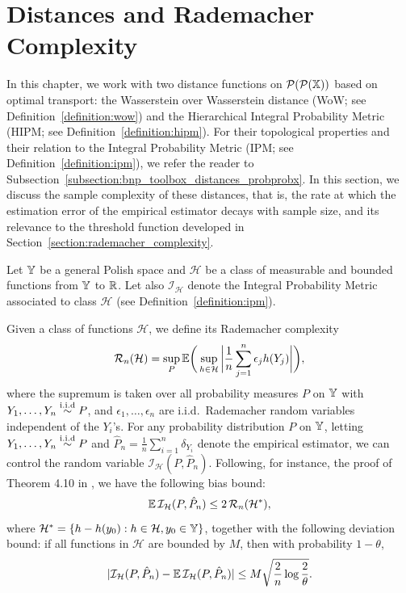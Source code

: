 \section{Distances and Rademacher Complexity}\label{section:two_sample_distances}

In this chapter, we work with two distance functions on $\mathcal{P}(\mathcal{P}(\mathbb{X}))$ based on optimal transport: the Wasserstein over Wasserstein distance (WoW; see Definition~\ref{definition:wow}) and the Hierarchical Integral Probability Metric (HIPM; see Definition~\ref{definition:hipm}). For their topological properties and their relation to the Integral Probability Metric (IPM; see Definition~\ref{definition:ipm}), we refer the reader to Subsection~\ref{subsection:bnp_toolbox_distances_probprobx}. In this section, we discuss the sample complexity of these distances, that is, the rate at which the estimation error of the empirical estimator decays with sample size, and its relevance to the threshold function developed in Section~\ref{section:rademacher_complexity}.

Let $\mathbb{Y}$ be a general Polish space and $\mathcal{H}$ be a class of measurable and bounded functions from $\mathbb{Y}$ to $\mathbb{R}$. Let also $\mathcal{I}_{\mathcal{H}}$ denote the Integral Probability Metric associated to class $\mathcal{H}$ (see Definition~\ref{definition:ipm}).

Given a class of functions $\mathcal{H}$, we define its Rademacher complexity
\begin{equation}
\label{equation:rademacher_complexity}
\mathcal{R}_n(\mathcal{H}) = \sup_P \mathbb{E} \bigg( \sup_{h \in \mathcal{H}} \bigg| \frac{1}{n} \sum_{j=1}^n \epsilon_j h(Y_j) \bigg| \bigg),
\end{equation}
where the supremum is taken over all probability measures $P$ on $\mathbb{Y}$ with $Y_1, \ldots, Y_n \overset{\mathrm{i.i.d}}{\sim} P$, and $\epsilon_1, \ldots, \epsilon_n$ are i.i.d.\ Rademacher random variables independent of the $Y_i$'s. For any probability distribution $P$ on $\mathbb{Y}$, letting $Y_1, \ldots, Y_n \overset{\mathrm{i.i.d}}{\sim} P$ and $\hat{P}_n = \frac{1}{n} \sum_{i=1}^n \delta_{Y_i}$ denote the empirical estimator, we can control the random variable $\mathcal{I}_{\mathcal{H}}(P,\hat{P}_n)$. Following, for instance, the proof of Theorem 4.10 in \cite{wainwright2019high}, we have the following bias bound:
\begin{equation}
\label{eq:IPM_R}
\mathbb{E} \, \mathcal{I}_{\mathcal{H}}(P,\hat{P}_n) \leq 2 \, \mathcal{R}_n(\mathcal{H}^*),
\end{equation}
where $\mathcal{H}^* = \left\{h - h(y_0) : h \in \mathcal{H}, y_0 \in \mathbb{Y} \right\}$,
together with the following deviation bound: if all functions in $\mathcal{H}$ are bounded by $M$, then with probability $1-\theta$,
\begin{equation}
\label{eq:IPM_deviation_one_measure}
|\mathcal{I}_{\mathcal{H}}(P,\hat{P}_n) - \mathbb{E} \, \mathcal{I}_{\mathcal{H}}(P,\hat{P}_n)| \leq M \sqrt{\frac{2}{n} \log \frac{2}{\theta}}.
\end{equation}

